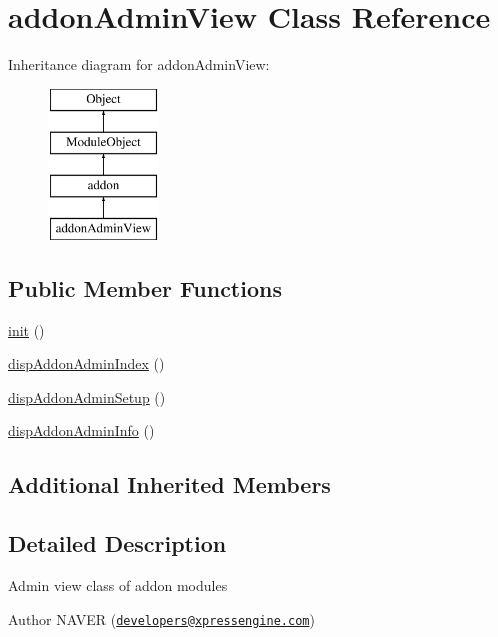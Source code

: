\hypertarget{classaddonAdminView}{\section{addon\-Admin\-View Class Reference}
\label{classaddonAdminView}
}
Inheritance diagram for addon\-Admin\-View\-:\begin{figure}[H]
\begin{center}
\leavevmode
\includegraphics[height=4.000000cm]{classaddonAdminView}
\end{center}
\end{figure}
\subsection*{Public Member Functions}
\begin{DoxyCompactItemize}
\item 
\hyperlink{classaddonAdminView_a2a2cd475d7a4d6111e7e9b3dafb4de01}{init} ()
\item 
\hyperlink{classaddonAdminView_ac460e3c832e8209833bd5f50ab41910c}{disp\-Addon\-Admin\-Index} ()
\item 
\hyperlink{classaddonAdminView_a14aef8b4e451f5eac1872ddc00530d50}{disp\-Addon\-Admin\-Setup} ()
\item 
\hyperlink{classaddonAdminView_a90e6af25e34c4834bd43633da6d83b60}{disp\-Addon\-Admin\-Info} ()
\end{DoxyCompactItemize}
\subsection*{Additional Inherited Members}


\subsection{Detailed Description}
Admin view class of addon modules \begin{DoxyAuthor}{Author}
N\-A\-V\-E\-R (\href{mailto:developers@xpressengine.com}{\tt developers@xpressengine.\-com}) 
\end{DoxyAuthor}


